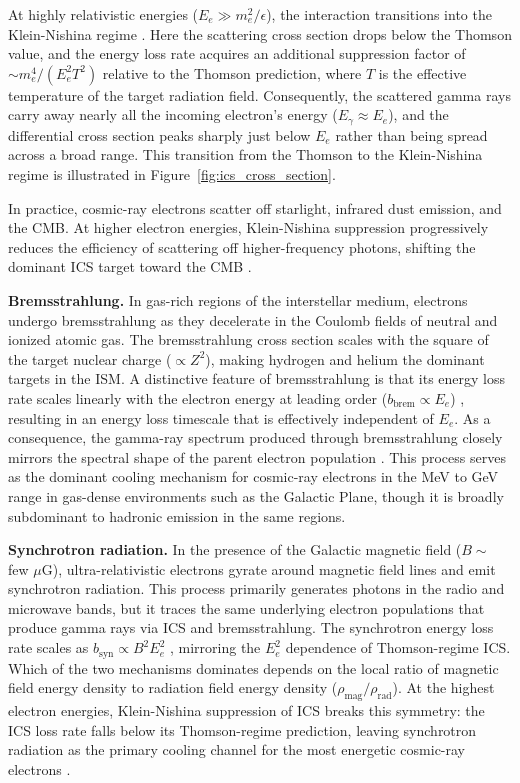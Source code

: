 At highly relativistic energies ($E_e \gg m_e^2/\epsilon$), the interaction transitions into the Klein-Nishina regime \cite{Hooper:2024}.
Here the scattering cross section drops below the Thomson value, and the energy loss rate acquires an additional suppression factor of $\sim m_e^4 / (E_e^2 T^2)$ relative to the Thomson prediction, where $T$ is the effective temperature of the target radiation field.
Consequently, the scattered gamma rays carry away nearly all the incoming electron's energy ($E_\gamma \approx E_e$), and the differential cross section peaks sharply just below $E_e$ rather than being spread across a broad range.
This transition from the Thomson to the Klein-Nishina regime is illustrated in Figure~\ref{fig:ics_cross_section}.

In practice, cosmic-ray electrons scatter off starlight, infrared dust emission, and the CMB.
At higher electron energies, Klein-Nishina suppression progressively reduces the efficiency of scattering off higher-frequency photons, shifting the dominant ICS target toward the CMB \cite{Hooper:2024}.

\textbf{Bremsstrahlung.}
In gas-rich regions of the interstellar medium, electrons undergo
bremsstrahlung as they decelerate in the Coulomb fields of neutral and ionized atomic gas.
The bremsstrahlung cross section scales with the square of the target nuclear charge ($\propto Z^2$), making hydrogen and helium the dominant targets in the ISM.
A distinctive feature of bremsstrahlung is that its energy loss rate scales linearly with the electron energy at leading order ($b_\text{brem} \propto E_e$) \cite{Pinetti:2021jjs}, resulting in an energy loss timescale that is effectively independent of $E_e$.
As a consequence, the gamma-ray spectrum produced through bremsstrahlung closely mirrors the spectral shape of the parent electron population \cite{Hooper:2024}.
This process serves as the dominant cooling mechanism for cosmic-ray electrons in the MeV to GeV range in gas-dense environments such as the Galactic Plane, though it is broadly subdominant to hadronic emission in the same regions.

\textbf{Synchrotron radiation.}
In the presence of the Galactic magnetic field ($B \sim$ few $\mu$G), ultra-relativistic electrons gyrate around magnetic field lines and emit synchrotron radiation.
This process primarily generates photons in the radio and microwave bands, but it traces the same underlying electron populations that produce gamma rays via ICS and bremsstrahlung.
The synchrotron energy loss rate scales as $b_\text{syn} \propto B^2 E_e^2$ \cite{Hooper:2024}, mirroring the $E_e^2$ dependence of Thomson-regime ICS.
Which of the two mechanisms dominates depends on the local ratio of magnetic field energy density to radiation field energy density ($\rho_\text{mag}/\rho_\text{rad}$).
At the highest electron energies, Klein-Nishina suppression of ICS breaks this symmetry: the ICS loss rate falls below its Thomson-regime prediction, leaving synchrotron radiation as the primary cooling channel for the most energetic cosmic-ray electrons \cite{Hooper:2024}.

